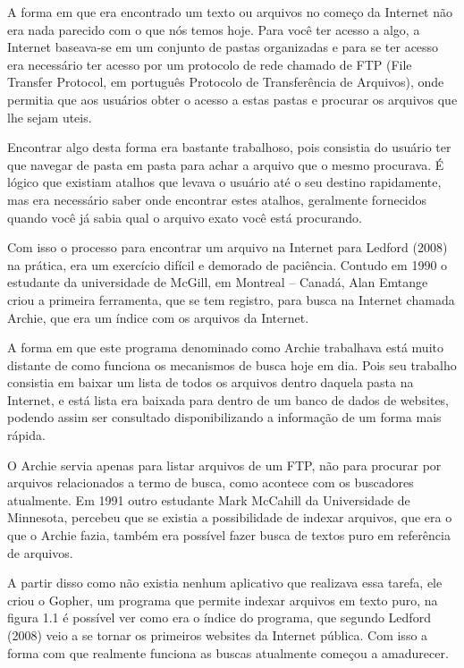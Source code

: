 \documentclass[
	12pt,				%
	openright,			%
	twoside,			%
	a4paper,			%
	english,			%
	french,				%
	spanish,			%
	brazil				%
	]{abntex2}
\begin{document}
A forma em que era encontrado um texto ou arquivos no começo da Internet não era nada parecido com o que nós temos hoje. Para você ter acesso a algo, a Internet baseava-se em um conjunto de pastas organizadas e para se ter acesso era necessário ter acesso por um protocolo de rede chamado de FTP (File Transfer Protocol, em português Protocolo de Transferência de Arquivos), onde permitia que aos usuários obter o acesso a estas pastas e procurar os arquivos que lhe sejam uteis.

Encontrar algo desta forma era bastante trabalhoso, pois consistia do usuário ter que navegar de pasta em pasta para achar a arquivo que o mesmo procurava. É lógico que existiam atalhos que levava o usuário até o seu destino rapidamente, mas era necessário saber onde encontrar estes atalhos, geralmente fornecidos quando você já sabia qual o arquivo exato você está procurando.

Com isso o processo para encontrar um arquivo na Internet para Ledford (2008) na prática, era um exercício difícil e demorado de paciência. Contudo em 1990 o estudante da universidade de McGill, em Montreal – Canadá, Alan Emtange criou a primeira ferramenta, que se tem registro, para busca na Internet chamada Archie, que era um índice com os arquivos da Internet.

A forma em que este programa denominado como Archie trabalhava está muito distante de como funciona os mecanismos de busca hoje em dia. Pois seu trabalho consistia em baixar um lista de todos os arquivos dentro daquela pasta na Internet, e está lista era baixada para dentro de um banco de dados de websites, podendo assim ser consultado disponibilizando a informação de um forma mais rápida.

O Archie servia apenas para listar arquivos de um FTP, não para procurar por arquivos relacionados a termo de busca, como acontece com os buscadores atualmente. Em 1991 outro estudante Mark McCahill da Universidade de Minnesota, percebeu que se existia a possibilidade de indexar arquivos, que era o que o Archie fazia, também era possível fazer busca de textos puro em referência de arquivos.

A partir disso como não existia nenhum aplicativo que realizava essa tarefa, ele criou o Gopher, um programa que permite indexar arquivos em texto puro, na figura 1.1 é possível ver como era o índice do programa, que segundo Ledford (2008) veio a se tornar os primeiros websites da Internet pública. Com isso a forma com que realmente funciona as buscas atualmente começou a amadurecer.
\end{document}
